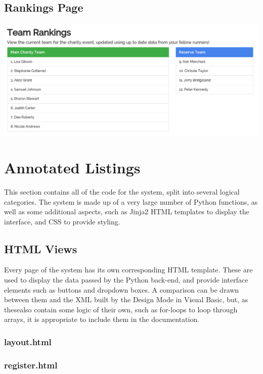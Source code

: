 \documentclass{article}[12pt,a4paper]
\begin{document}
\subsection{Rankings Page}
\includegraphics[scale=0.35]{final_ui/rankings}

\section{Annotated Listings}
This section contains all of the code for the system, split into several logical categories. The system is made up of a very large number of Python functions, as well as some additional aspects, such as Jinja2 HTML templates to display the interface, and CSS to provide styling.

\subsection{HTML Views}
Every page of the system has its own corresponding HTML template. These are used to display the data passed by the Python back-end, and provide interface elements such as buttons and dropdown boxes. A comparison can be drawn between them and the XML built by the Design Mode in Visual Basic, but, as thesealso contain some logic of their own, such as for-loops to loop through arrays, it is appropriate to include them in the documentation.

\subsubsection{layout.html}


\subsubsection{register.html}

\end{document}
